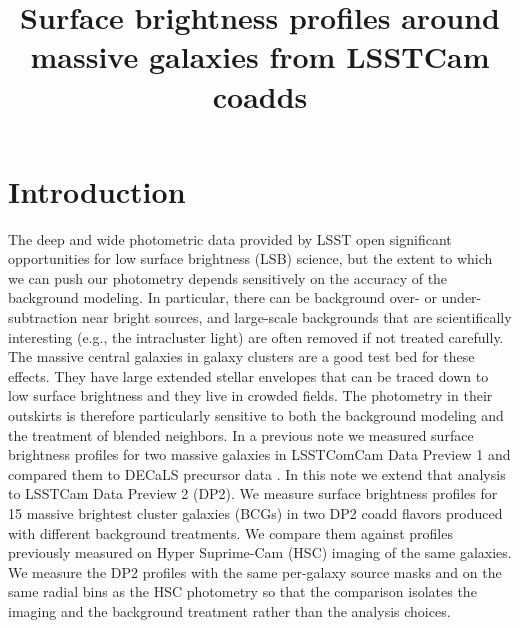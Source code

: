 \documentclass[SE,lsstdraft,authoryear,toc]{lsstdoc}
\title{Surface brightness profiles around massive galaxies from LSSTCam coadds}
\date{\vcsDate}
\begin{document}
\maketitle

\section{Introduction}
The deep and wide photometric data provided by LSST open significant opportunities for low surface brightness (LSB) science, but the extent to which we can push our photometry depends sensitively on the accuracy of the background modeling. In particular, there can be background over- or under-subtraction near bright sources, and large-scale backgrounds that are scientifically interesting (e.g., the intracluster light) are often removed if not treated carefully. The massive central galaxies in galaxy clusters are a good test bed for these effects. They have large extended stellar envelopes that can be traced down to low surface brightness and they live in crowded fields. The photometry in their outskirts is therefore particularly sensitive to both the background modeling and the treatment of blended neighbors. In a previous note we measured surface brightness profiles for two massive galaxies in LSSTComCam Data Preview 1 and compared them to DECaLS precursor data . In this note we extend that analysis to LSSTCam Data Preview 2 (DP2). We measure surface brightness profiles for 15 massive brightest cluster galaxies (BCGs) in two DP2 coadd flavors produced with different background treatments. We compare them against profiles previously measured on Hyper Suprime-Cam (HSC) imaging of the same galaxies. We measure the DP2 profiles with the same per-galaxy source masks and on the same radial bins as the HSC photometry so that the comparison isolates the imaging and the background treatment rather than the analysis choices.
\end{document}
